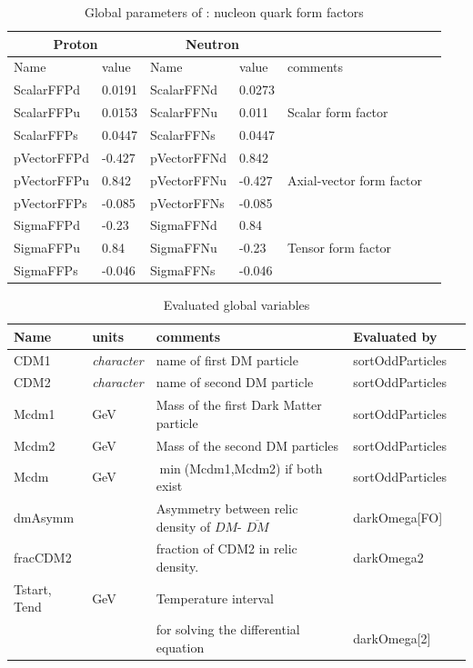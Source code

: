 \documentclass[12pt,a4paper]{article}
\begin{document}
\begin{table}[ht!]\centering
\caption{Global parameters of \micro :  nucleon quark form factors}\label{FFTab}
\begin{tabular}{|l|l|l|l|l|l|}
\hline
 \multicolumn{2}{|c|}{Proton}& \multicolumn{2}{|c|}{Neutron} & \\ \hline
  Name      &  value       &  Name      &  value     &  comments \\  \hline
ScalarFFPd  &  0.0191     &ScalarFFNd  &  0.0273  & \\
ScalarFFPu  &  0.0153     &ScalarFFNu  &  0.011 & Scalar form factor \\
ScalarFFPs  &  0.0447      &ScalarFFNs  &  0.0447   & \\
\hline
pVectorFFPd &  -0.427      &pVectorFFNd &  0.842    & \\
pVectorFFPu &   0.842      &pVectorFFNu &  -0.427   & Axial-vector form factor\\
pVectorFFPs &  -0.085      &pVectorFFNs &  -0.085   & \\
\hline
SigmaFFPd   &  -0.23       &SigmaFFNd   &  0.84     & \\
SigmaFFPu   &   0.84       &SigmaFFNu   &  -0.23    & Tensor form factor\\
SigmaFFPs   &   -0.046     &SigmaFFNs   &  -0.046   & \\
\hline
\end{tabular}\vspace*{3mm}
\end{table}

\begin{table}[ht!]\centering
 \caption{Evaluated global  variables}
 \label{paramTabEval}
\begin{tabular}{|l|l|l|l|l|}
\hline
  Name      & units          & comments                                       & Evaluated by      \\  \hline
  CDM1      &{\it character} & name of first DM particle                 & sortOddParticles  \\     
  CDM2      &{\it character} &  name of second  DM particle             & sortOddParticles  \\
  Mcdm1     &  GeV           & Mass of the first Dark Matter particle         & sortOddParticles  \\ 
  Mcdm2     &  GeV           & Mass of the second DM particles                & sortOddParticles  \\
  Mcdm      &  GeV           & $\min$(Mcdm1,Mcdm2) if both exist              & sortOddParticles  \\
  dmAsymm   &                & Asymmetry between relic density of ${DM}$- $\overline{DM}$ & darkOmega[FO]\\
  fracCDM2  &                & fraction of CDM2 in relic density.             & darkOmega2\\
  Tstart, Tend &   GeV       & Temperature interval& \\
&&   for solving the differential equation     &  darkOmega[2]\\  
\hline
\end{tabular}\vspace*{3mm}
\end{table}
\end{document}

